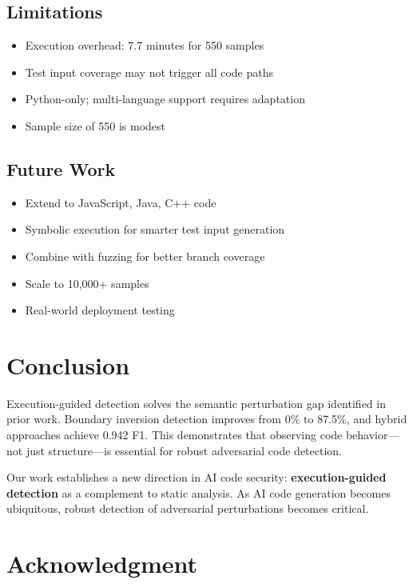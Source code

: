 \documentclass[conference]{IEEEtran}
\begin{document}
\subsection{Limitations}

\begin{itemize}
    \item Execution overhead: 7.7 minutes for 550 samples
    \item Test input coverage may not trigger all code paths
    \item Python-only; multi-language support requires adaptation
    \item Sample size of 550 is modest
\end{itemize}

\subsection{Future Work}

\begin{itemize}
    \item Extend to JavaScript, Java, C++ code
    \item Symbolic execution for smarter test input generation
    \item Combine with fuzzing for better branch coverage
    \item Scale to 10,000+ samples
    \item Real-world deployment testing
\end{itemize}

\section{Conclusion}
\label{sec:conclusion}

Execution-guided detection solves the semantic perturbation gap identified in prior work. Boundary inversion detection improves from 0\% to 87.5\%, and hybrid approaches achieve 0.942 F1. This demonstrates that observing code behavior---not just structure---is essential for robust adversarial code detection.

Our work establishes a new direction in AI code security: \textbf{execution-guided detection} as a complement to static analysis. As AI code generation becomes ubiquitous, robust detection of adversarial perturbations becomes critical.

\section*{Acknowledgment}
\end{document}

